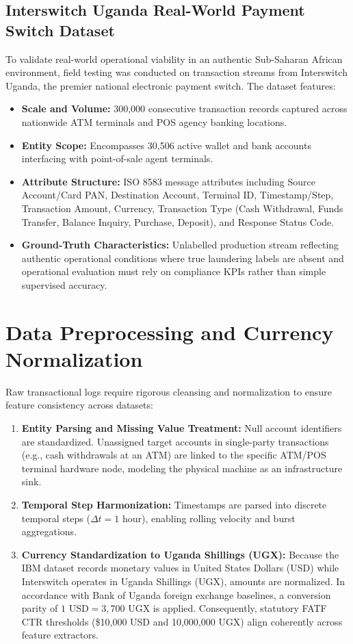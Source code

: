 \subsection{Interswitch Uganda Real-World Payment Switch Dataset}
To validate real-world operational viability in an authentic Sub-Saharan African environment, field testing was conducted on transaction streams from Interswitch Uganda, the premier national electronic payment switch. The dataset features:
\begin{itemize}
    \item \textbf{Scale and Volume:} 300,000 consecutive transaction records captured across nationwide ATM terminals and POS agency banking locations.
    \item \textbf{Entity Scope:} Encompasses 30,506 active wallet and bank accounts interfacing with point-of-sale agent terminals.
    \item \textbf{Attribute Structure:} ISO 8583 message attributes including Source Account/Card PAN, Destination Account, Terminal ID, Timestamp/Step, Transaction Amount, Currency, Transaction Type (Cash Withdrawal, Funds Transfer, Balance Inquiry, Purchase, Deposit), and Response Status Code.
    \item \textbf{Ground-Truth Characteristics:} Unlabelled production stream reflecting authentic operational conditions where true laundering labels are absent and operational evaluation must rely on compliance KPIs rather than simple supervised accuracy.
\end{itemize}

\section{Data Preprocessing and Currency Normalization}
Raw transactional logs require rigorous cleansing and normalization to ensure feature consistency across datasets:
\begin{enumerate}
    \item \textbf{Entity Parsing and Missing Value Treatment:} Null account identifiers are standardized. Unassigned target accounts in single-party transactions (e.g., cash withdrawals at an ATM) are linked to the specific ATM/POS terminal hardware node, modeling the physical machine as an infrastructure sink.
    \item \textbf{Temporal Step Harmonization:} Timestamps are parsed into discrete temporal steps ($\Delta t = 1\text{ hour}$), enabling rolling velocity and burst aggregations.
    \item \textbf{Currency Standardization to Uganda Shillings (UGX):} Because the IBM dataset records monetary values in United States Dollars (USD) while Interswitch operates in Uganda Shillings (UGX), amounts are normalized. In accordance with Bank of Uganda foreign exchange baselines, a conversion parity of $1\text{ USD} = 3,700\text{ UGX}$ is applied. Consequently, statutory FATF CTR thresholds (\$10,000 USD and 10,000,000 UGX) align coherently across feature extractors.
\end{enumerate}

